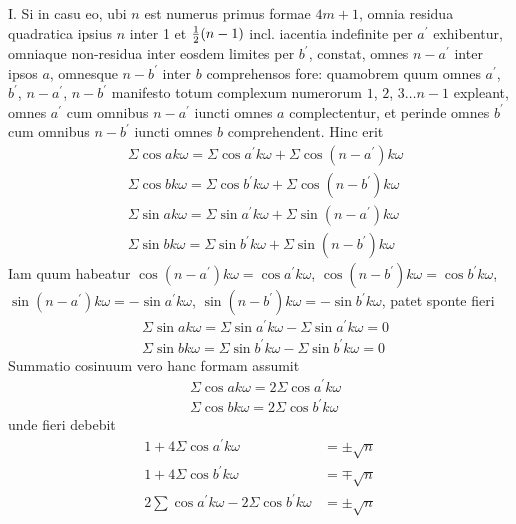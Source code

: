 \documentclass[twoside,12pt, showframe]{memoir}
\let\oldfrac\frac
\def\frac#1#2{\mathchoice{\tfrac{#1}{#2}}{\oldfrac{#1}{#2}}{\genfrac{}{}{}{2}{#1}{#2\mathstrut}}{\genfrac{}{}{}{3}{#1}{#2\mathstrut}}}
\begin{document}
I. Si in casu eo, ubi \(n\) est numerus primus formae \(4 m+1\), omnia residua quadratica ipsius \(n\) inter 1 et \(\frac{1}{2}(n-1)\) incl. iacentia indefinite per \(a^{\prime}\) exhibentur, omniaque non-residua inter eosdem limites per \(b^{\prime}\), constat, omnes \(n-a^{\prime}\) inter ipsos \(a\), omnesque \(n-b^{\prime}\) inter \(b\) comprehensos fore: quamobrem quum omnes \(a^{\prime}\), \(b^{\prime}\), \(n-a^{\prime}\), \(n-b^{\prime}\) manifesto totum complexum numerorum \(1\), \(2\), \(3 \ldots n-1\) expleant, omnes \(a^{\prime}\) cum omnibus \(n-a^{\prime}\) iuncti omnes \(a\) complectentur, et perinde omnes \(b^{\prime}\) cum omnibus \(n-b^{\prime}\) iuncti omnes \(b\) comprehendent. Hinc erit\clearpage\noindent%
\[\begin{aligned}
& \Sigma \cos a k \omega=\Sigma \cos a^{\prime} k \omega+\Sigma \cos (n-a^{\prime}) k \omega \\
& \Sigma \cos b k \omega=\Sigma \cos b^{\prime} k \omega+\Sigma \cos (n-b^{\prime}) k \omega \\
& \Sigma \sin a k \omega=\Sigma \sin a^{\prime} k \omega+\Sigma \sin (n-a^{\prime}) k \omega \\
& \Sigma \sin b k \omega=\Sigma \sin b^{\prime} k \omega+\Sigma \sin (n-b^{\prime}) k \omega
\end{aligned}\]
Iam quum habeatur \(\cos (n-a^{\prime}) k \omega=\cos a^{\prime} k \omega\), \(\cos (n-b^{\prime}) k \omega=\cos b^{\prime} k \omega\), \(\sin (n-a^{\prime}) k \omega=-\sin a^{\prime} k \omega\), \(\sin (n-b^{\prime}) k \omega=-\sin b^{\prime} k \omega\), patet sponte fieri
\[\begin{aligned}
& \Sigma \sin a k \omega=\Sigma \sin a^{\prime} k \omega-\Sigma \sin a^{\prime} k \omega=0 \\
& \Sigma \sin b k \omega=\Sigma \sin b^{\prime} k \omega-\Sigma \sin b^{\prime} k \omega=0
\end{aligned}\]
Summatio cosinuum vero hanc formam assumit
\[\begin{aligned}
& \Sigma \cos a k \omega=2 \Sigma \cos a^{\prime} k \omega \\
& \Sigma \cos b k \omega=2 \Sigma \cos b^{\prime} k \omega
\end{aligned}\]
unde fieri debebit
\[\begin{aligned}
1+4 \Sigma \cos a^{\prime} k \omega & = \pm \surd n \\
1+4 \Sigma \cos b^{\prime} k \omega & = \mp \surd n \\
2 \sum \cos a^{\prime} k \omega-2 \Sigma \cos b^{\prime} k \omega & = \pm \surd n
\end{aligned}\]
\end{document}
